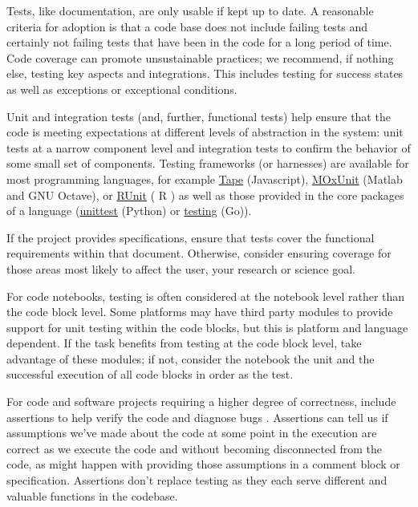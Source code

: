 \documentclass{article}
\newcounter{subsubsubsection}[subsubsection]
\begin{document}
Tests, like documentation, are only usable if kept up to date. A reasonable criteria for adoption is that a code base does not include failing tests and certainly not failing tests that have been in the code for a long period of time. Code coverage can promote unsustainable practices; we recommend, if nothing else, testing key aspects and integrations. This includes testing for success states as well as exceptions or exceptional conditions. 

Unit and integration tests (and, further, functional tests) help ensure that the code is meeting expectations at different levels of abstraction in the system: unit tests at a narrow component level and integration tests to confirm the behavior of some small set of components. Testing frameworks (or harnesses) are available for most programming languages, for example \href{https://github.com/substack/tape} {Tape} (Javascript), \href{https://github.com/MOxUnit/MOxUnit} {MOxUnit} (Matlab and GNU Octave), or \href{https://cran.r-project.org/web/packages/RUnit/index.html} {RUnit} ( R ) as well as those provided in the core packages of a language (\href{https://docs.python.org/3.5/library/unittest.html} {unittest} (Python) or \href{https://golang.org/pkg/testing/} {testing} (Go)). 
 
If the project provides specifications, ensure that tests cover the functional requirements within that document. Otherwise, consider ensuring coverage for those areas most likely to affect the user, your research or science goal.
 
For code notebooks, testing is often considered at the notebook level rather than the code block level. Some platforms may have third party modules to provide support for unit testing within the code blocks, but this is platform and language dependent. If the task benefits from testing at the code block level, take advantage of these modules; if not, consider the notebook the unit and the successful execution of all code blocks in order as the test.
 
For code and software projects requiring a higher degree of correctness, include assertions to help verify the code and diagnose bugs \autocite{regehr_use_2014,kudrjavets_assessing_2006}. Assertions can tell us if assumptions we’ve made about the code at some point in the execution are correct as we execute the code and without becoming disconnected from the code, as might happen with providing those assumptions in a comment block or specification. Assertions don’t replace testing as they each serve different and valuable functions in the codebase.
\end{document}
